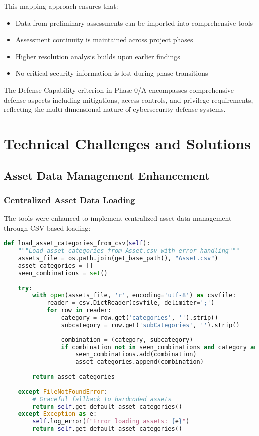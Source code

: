 \documentclass[binding=0.6cm]{sapthesis}
\begin{document}
This mapping approach ensures that:
\begin{itemize}
    \item Data from preliminary assessments can be imported into comprehensive tools
    \item Assessment continuity is maintained across project phases
    \item Higher resolution analysis builds upon earlier findings
    \item No critical security information is lost during phase transitions
\end{itemize}

The Defense Capability criterion in Phase 0/A encompasses comprehensive defense aspects including mitigations, access controls, and privilege requirements, reflecting the multi-dimensional nature of cybersecurity defense systems.

\section{Technical Challenges and Solutions}

\subsection{Asset Data Management Enhancement}

\subsubsection{Centralized Asset Data Loading}

The tools were enhanced to implement centralized asset data management through CSV-based loading:

\begin{lstlisting}[language=Python, caption=Enhanced Asset Loading Implementation]
def load_asset_categories_from_csv(self):
    """Load asset categories from Asset.csv with error handling"""
    assets_file = os.path.join(get_base_path(), "Asset.csv")
    asset_categories = []
    seen_combinations = set()
    
    try:
        with open(assets_file, 'r', encoding='utf-8') as csvfile:
            reader = csv.DictReader(csvfile, delimiter=';')
            for row in reader:
                category = row.get('categories', '').strip()
                subcategory = row.get('subCategories', '').strip()
                
                combination = (category, subcategory)
                if combination not in seen_combinations and category and subcategory:
                    seen_combinations.add(combination)
                    asset_categories.append(combination)
        
        return asset_categories
        
    except FileNotFoundError:
        # Graceful fallback to hardcoded assets
        return self.get_default_asset_categories()
    except Exception as e:
        self.log_error(f"Error loading assets: {e}")
        return self.get_default_asset_categories()
\end{lstlisting}
\end{document}
